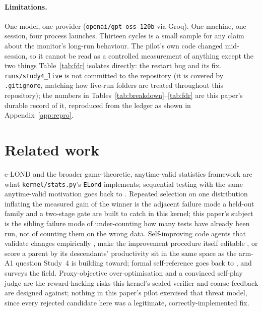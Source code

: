 \documentclass[11pt]{article}
\begin{document}
\paragraph{Limitations.} One model, one provider (\texttt{openai/gpt-oss-120b} via Groq). One machine, one session, four process launches. Thirteen cycles is a small sample for any claim about the monitor's long-run behaviour. The pilot's own code changed mid-session, so it cannot be read as a controlled measurement of anything except the two things Table~\ref{tab:fdr} isolates directly: the restart bug and its fix. \texttt{runs/study4\_live} is not committed to the repository (it is covered by \texttt{.gitignore}, matching how live-run folders are treated throughout this repository); the numbers in Tables~\ref{tab:breakdown}--\ref{tab:fdr} are this paper's durable record of it, reproduced from the ledger as shown in Appendix~\ref{app:repro}.

\section{Related work}

e-LOND \citep{xu2024elond} and the broader game-theoretic, anytime-valid statistics framework \citep{ramdas2023gtsavi} are what \texttt{kernel/stats.py}'s \texttt{ELond} implements; sequential testing with the same anytime-valid motivation goes back to \citet{wald1945sprt}. Repeated selection on one distribution inflating the measured gain of the winner \citep{dwork2015holdout} is the adjacent failure mode a held-out family and a two-stage gate are built to catch in this kernel; this paper's subject is the sibling failure mode of under-counting how many tests have already been run, not of counting them on the wrong data. Self-improving code agents that validate changes empirically \citep{zhang2025dgm}, make the improvement procedure itself editable \citep{zhang2026hyperagents}, or score a parent by its descendants' productivity \citep{wang2026hgm} sit in the same space as the arm-A1 question Study~4 is building toward; formal self-reference goes back to \citet{schmidhuber2007godel}, and \citet{chen2026rsi} surveys the field. Proxy-objective over-optimisation \citep{gao2023scaling,coste2024ensembles} and a convinced self-play judge \citep{zhou2026convincing} are the reward-hacking risks this kernel's sealed verifier and coarse feedback are designed against; nothing in this paper's pilot exercised that threat model, since every rejected candidate here was a legitimate, correctly-implemented fix.
\end{document}
